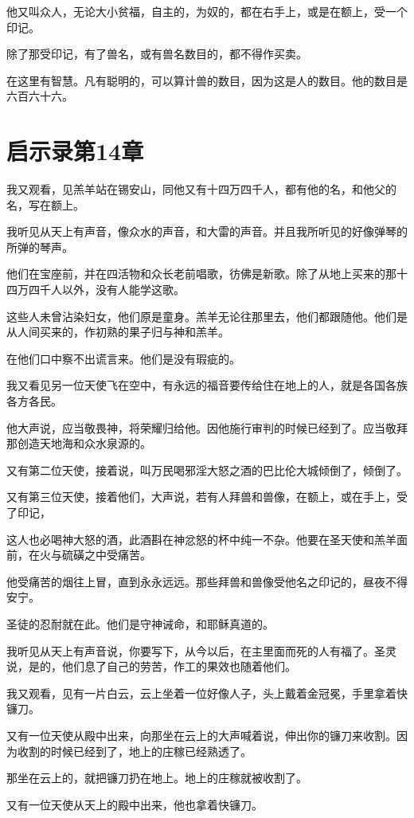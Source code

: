 \documentclass[12pt,oneside]{book}
\begin{document}
他又叫众人，无论大小贫福，自主的，为奴的，都在右手上，或是在额上，受一个印记。

除了那受印记，有了兽名，或有兽名数目的，都不得作买卖。

在这里有智慧。凡有聪明的，可以算计兽的数目，因为这是人的数目。他的数目是六百六十六。

\chapter{启示录第14章}
我又观看，见羔羊站在锡安山，同他又有十四万四千人，都有他的名，和他父的名，写在额上。

我听见从天上有声音，像众水的声音，和大雷的声音。并且我所听见的好像弹琴的所弹的琴声。

他们在宝座前，并在四活物和众长老前唱歌，彷佛是新歌。除了从地上买来的那十四万四千人以外，没有人能学这歌。

这些人未曾沾染妇女，他们原是童身。羔羊无论往那里去，他们都跟随他。他们是从人间买来的，作初熟的果子归与神和羔羊。

在他们口中察不出谎言来。他们是没有瑕疵的。

我又看见另一位天使飞在空中，有永远的福音要传给住在地上的人，就是各国各族各方各民。

他大声说，应当敬畏神，将荣耀归给他。因他施行审判的时候已经到了。应当敬拜那创造天地海和众水泉源的。

又有第二位天使，接着说，叫万民喝邪淫大怒之酒的巴比伦大城倾倒了，倾倒了。

又有第三位天使，接着他们，大声说，若有人拜兽和兽像，在额上，或在手上，受了印记，

这人也必喝神大怒的酒，此酒斟在神忿怒的杯中纯一不杂。他要在圣天使和羔羊面前，在火与硫磺之中受痛苦。

他受痛苦的烟往上冒，直到永永远远。那些拜兽和兽像受他名之印记的，昼夜不得安宁。

圣徒的忍耐就在此。他们是守神诫命，和耶稣真道的。

我听见从天上有声音说，你要写下，从今以后，在主里面而死的人有福了。圣灵说，是的，他们息了自己的劳苦，作工的果效也随着他们。

我又观看，见有一片白云，云上坐着一位好像人子，头上戴着金冠冕，手里拿着快镰刀。

又有一位天使从殿中出来，向那坐在云上的大声喊着说，伸出你的镰刀来收割。因为收割的时候已经到了，地上的庄稼已经熟透了。

那坐在云上的，就把镰刀扔在地上。地上的庄稼就被收割了。

又有一位天使从天上的殿中出来，他也拿着快镰刀。
\end{document}
